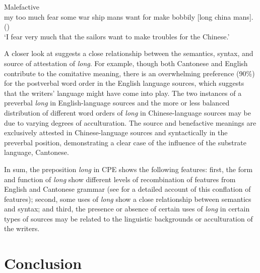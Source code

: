 \documentclass[english,output=paper,colorlinks,citecolor=brown]{../langscibook}
\begin{document}
\ex Malefactive\\\label{ex:7:9}
my too much fear some war ship mans want for make bobbily [long china mans]. (\citealt[968]{Tilden1834})\\
\glt ‘I fear very much that the sailors want to make troubles for the Chinese.’
\z
    
A closer look at  suggests a close relationship between the semantics, syntax, and source of attestation of \textit{long}. For example, though both Cantonese and English contribute to the comitative meaning, there is an overwhelming preference (90\%) for the postverbal word order in the English language sources, which suggests that the writers’ language might have come into play. The two instances of a preverbal \textit{long} in English-language sources and the more or less balanced distribution of different word orders of \textit{long} in Chinese-language sources may be due to varying degrees of acculturation. The source and benefactive meanings are exclusively attested in Chinese-language sources and syntactically in the preverbal position, demonstrating a clear case of the influence of the substrate language, Cantonese. 

In sum, the preposition \textit{long} in CPE shows the following features: first, the form and function of \textit{long} show different levels of recombination of features from English and Cantonese grammar (see \citealt{Li2011} for a detailed account of this conflation of features); second, some uses of \textit{long} show a close relationship between semantics and syntax; and third, the presence or absence of certain uses of \textit{long} in certain types of sources may be related to the linguistic backgrounds or acculturation of the writers.

\section{Conclusion}\label{sec:7:6}
\end{document}
